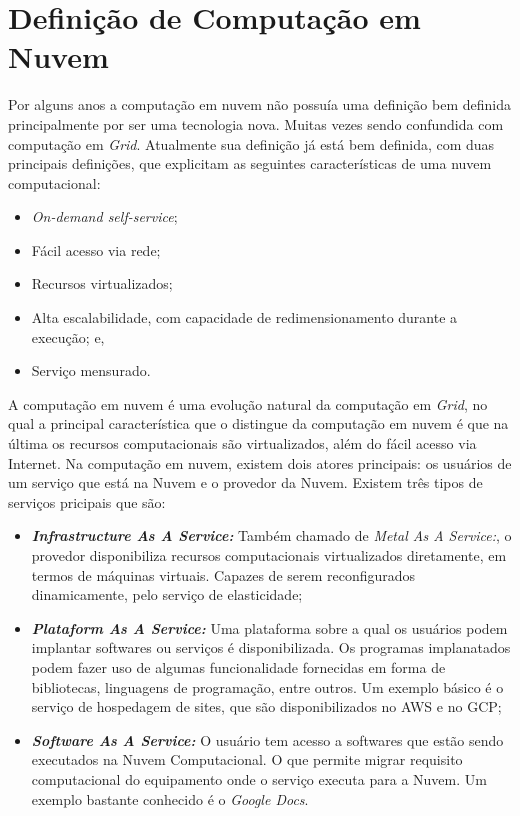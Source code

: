 \section{Definição de Computação em Nuvem}

Por alguns anos a computação em nuvem não possuía uma definição bem definida principalmente por ser uma tecnologia nova. Muitas vezes sendo confundida com computação em \textit{Grid}. Atualmente sua definição já está bem definida, com duas principais definições\cite{NIST_CLOUD_DEFINITION}\cite{Vaquero:2008:BCT:1496091.1496100_Cloud_definition}, que explicitam as seguintes características de uma nuvem computacional: 

\begin{itemize}
	\item \textit{On-demand self-service};
	\item Fácil acesso via rede;
	\item Recursos virtualizados;
	\item Alta escalabilidade, com capacidade de redimensionamento durante a execução; e,
	\item Serviço mensurado.
\end{itemize}

A computação em nuvem é uma evolução natural da computação em \textit{Grid}, no qual a principal característica que o distingue da computação em nuvem é que na última os recursos computacionais são virtualizados, além do fácil acesso via Internet. Na computação em nuvem, existem dois atores principais: os usuários de um serviço que está na Nuvem e o provedor da Nuvem. Existem três tipos de serviços pricipais que são\cite{NIST_CLOUD_DEFINITION}:

\begin{itemize}
	\item \textbf{\textit{Infrastructure As A Service:}} Também chamado de \textit{Metal As A Service:}, o provedor disponibiliza recursos computacionais virtualizados diretamente, em termos de máquinas virtuais. Capazes de serem reconfigurados dinamicamente, pelo serviço de elasticidade;
	\item \textbf{\textit{Plataform As A Service:}} Uma plataforma sobre a qual os usuários podem implantar softwares ou serviços é disponibilizada. Os programas implanatados podem fazer uso de algumas funcionalidade fornecidas em forma de bibliotecas, linguagens de programação, entre outros. Um exemplo básico é o serviço de hospedagem de sites, que são disponibilizados no \acrshort{AWS} e no \acrshort{GCP};
	\item \textbf{\textit{Software As A Service:}} O usuário tem acesso a softwares que estão sendo executados na Nuvem Computacional. O que permite migrar requisito computacional do equipamento onde o serviço executa para a Nuvem. Um exemplo bastante conhecido é o \textit{Google Docs}\cite{GoogleDocs}.
\end{itemize}

